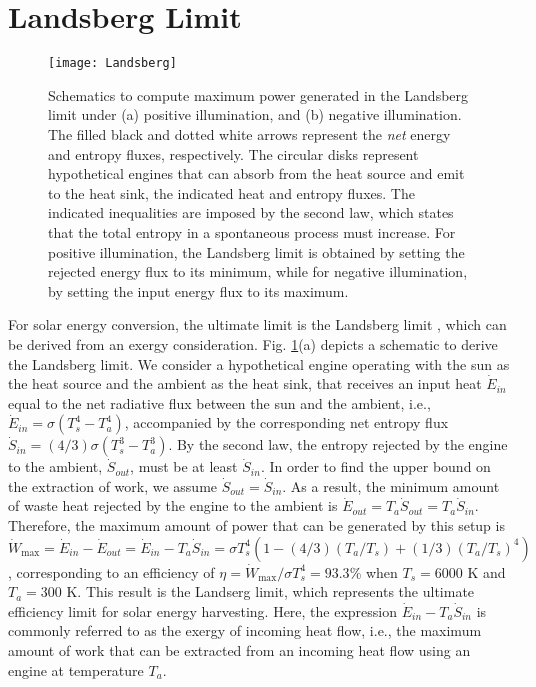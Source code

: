 \documentclass[notitlepage,onecolumn,aps,showpacs,preprintnumbers,amsmath,amssymb,superscriptaddress]{revtex4-1}
\begin{document}
\section{Landsberg Limit}
\begin{figure}
\centering
\texttt{[image: Landsberg]}
\caption{Schematics to compute maximum power generated in the Landsberg limit under (a) positive illumination, and (b) negative illumination. The filled black and dotted white arrows represent the \textit{net} energy and entropy fluxes, respectively. The circular disks represent hypothetical engines that can absorb from the heat source and emit to the heat sink, the indicated heat and entropy fluxes. The indicated inequalities are imposed by the second law, which states that the total entropy in a spontaneous process must increase. For positive illumination, the Landsberg limit is obtained by setting the rejected energy flux to its minimum, while for negative illumination, by setting the input energy flux to its maximum.}
\label{LandsbergFigure}
\end{figure}

For solar energy conversion, the ultimate limit is the Landsberg limit \citep{landsberg}, which can be derived from an exergy consideration. Fig. \ref{LandsbergFigure}(a) depicts a schematic to derive the Landsberg limit. We consider a hypothetical engine operating with the sun as the heat source and the ambient as the heat sink, that receives an input heat $\dot{E}_{in}$ equal to the net radiative flux between the sun and the ambient, i.e., $\dot{E}_{in}=\sigma(T_s^4-T_a^4)$, accompanied by the corresponding net entropy flux $\dot{S}_{in} = (4/3)\sigma(T_s^3-T_a^3)$. By the second law, the entropy rejected by the engine to the ambient, $\dot{S}_{out}$, must be at least $\dot{S}_{in}$. In order to find the upper bound on the extraction of work, we assume $\dot{S}_{out} = \dot{S}_{in}$. As a result, the minimum amount of waste heat rejected by the engine to the ambient is $\dot{E}_{out}=T_a\dot{S}_{out} = T_a\dot{S}_{in}$. Therefore, the maximum amount of power that can be generated by this setup is $\dot{W}_\textrm{max}=\dot{E}_{in}-\dot{E}_{out} = \dot{E}_{in} - T_a\dot{S}_{in} = \sigma T_s^4(1 - (4/3)(T_a/T_s) + (1/3)(T_a/T_s)^4)$, corresponding to an efficiency of $\eta = \dot{W}_\textrm{max}/\sigma T_s^4 = 93.3$\% when $T_s = 6000$ K and $T_a=300$ K. This result is the Landserg limit, which represents the ultimate efficiency limit for solar energy harvesting. Here, the expression $\dot{E}_{in} - T_a \dot{S}_{in}$ is commonly referred to as the exergy of incoming heat flow, i.e., the maximum amount of work that can be extracted from an incoming heat flow using an engine at temperature $T_a$. \\
\end{document}
